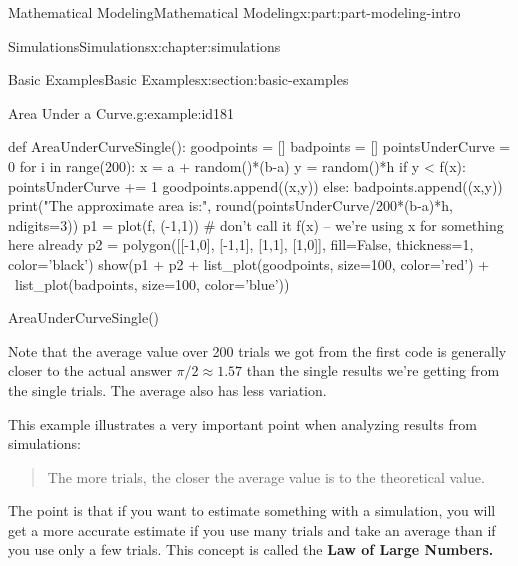 \documentclass[oneside,10pt,]{book}
\newcommand{\terminology}[1]{\textbf{#1}}
\numberwithin{equation}{section}
\begin{document}
\begin{partptx}{Mathematical Modeling}{}{Mathematical Modeling}{}{}{x:part:part-modeling-intro}
\begin{chapterptx}{Simulations}{}{Simulations}{}{}{x:chapter:simulations}
\begin{sectionptx}{Basic Examples}{}{Basic Examples}{}{}{x:section:basic-examples}
\begin{example}{Area Under a Curve.}{g:example:id181}
\begin{sageinput}
def AreaUnderCurveSingle():
    goodpoints = []
    badpoints = []
    pointsUnderCurve = 0
    for i in range(200):
        x = a + random()*(b-a)
        y = random()*h
        if y < f(x):
            pointsUnderCurve += 1
            goodpoints.append((x,y))
        else:
            badpoints.append((x,y))
    print("The approximate area is:", 
    	round(pointsUnderCurve/200*(b-a)*h, ndigits=3))
    p1 = plot(f, (-1,1)) # don't call it f(x) -- we're using x for something here already
    p2 = polygon([[-1,0], [-1,1], [1,1], [1,0]], 
    	fill=False, thickness=1, color='black')
    show(p1 + p2 + list_plot(goodpoints, size=100, color='red') + \
        list_plot(badpoints, size=100, color='blue'))
\end{sageinput}
\begin{sageinput}
AreaUnderCurveSingle()
\end{sageinput}
Note that the average value over 200 trials we got from the first code is generally closer to the actual answer \(\pi/2\approx 1.57\) than the single results we're getting from the single trials. The average also has less variation.%
\par
This example illustrates a very important point when analyzing results from simulations:%
\begin{quote}%
The more trials, the closer the average value is to the theoretical value.\end{quote}
The point is that if you want to estimate something with a simulation, you will get a more accurate estimate if you use many trials and take an average than if you use only a few trials. This concept is called the \terminology{Law of Large Numbers.}%
\end{example}
\end{sectionptx}
\end{chapterptx}
\end{partptx}
\end{document}
